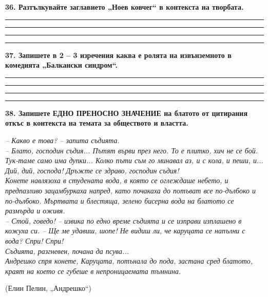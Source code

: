 \documentclass[12pt,a4paper]{article}
\begin{document}
\vspace{0.6cm}

\noindent
\textbf{36. Разтълкувайте заглавието „Ноев ковчег“ в контекста на творбата.}

\vspace{0.2cm}
\noindent\rule{\linewidth}{0.4pt}
\noindent\rule{\linewidth}{0.4pt}
\noindent\rule{\linewidth}{0.4pt}
\noindent\rule{\linewidth}{0.4pt}

\vspace{0.6cm}

\noindent
\textbf{37. Запишете в 2 -- 3 изречения каква е ролята на извънземното в комедията „Балкански синдром“.}

\vspace{0.2cm}
\noindent\rule{\linewidth}{0.4pt}
\noindent\rule{\linewidth}{0.4pt}
\noindent\rule{\linewidth}{0.4pt}
\noindent\rule{\linewidth}{0.4pt}

\vspace{0.6cm}

\noindent
\textbf{38. Запишете ЕДНО ПРЕНОСНО ЗНАЧЕНИЕ на блатото от цитирания откъс в контекста на темата за обществото и властта.}

\vspace{0.2cm}

\noindent
\textit{
-- Какво е това? -- запита съдията.\\
-- Блато, господин съдия... Пътят върви през него. То е плитко, хич не се бой. Тук-таме само има дупки... Колко пъти съм го минавал аз, и с кола, и пеши, и... Дий, дий, господа! Дръжте се здраво, господин съдия!\\
Конете навлязоха в студената вода, в която се оглеждаше небето, и предпазливо зацамбуркаха напред, като почакаха до потъват все по-дълбоко и по-дълбоко. Мъртвата и блестяща, зелено бисерна вода на блатото се размърда и оживя.\\
-- Стой, говедо! -- извика по едно време съдията и се изправи изплашено в кожуха си. -- Ще ме удавиш, шопе! Не видиш ли, че каруцата се напълни с вода? Спри! Спри!\\
Съдията, разгневен, почана да псува...\\
Андрешко спря конете, Каруцата, потънала до пода, застана сред блатото, краят на което се губеше в непроницаемата тъмнина.\\
}
\vspace{-0.2cm}

\hspace{11.5cm} (Елин Пелин, „Андрешко“)

\vspace{0.6cm}
\end{document}
